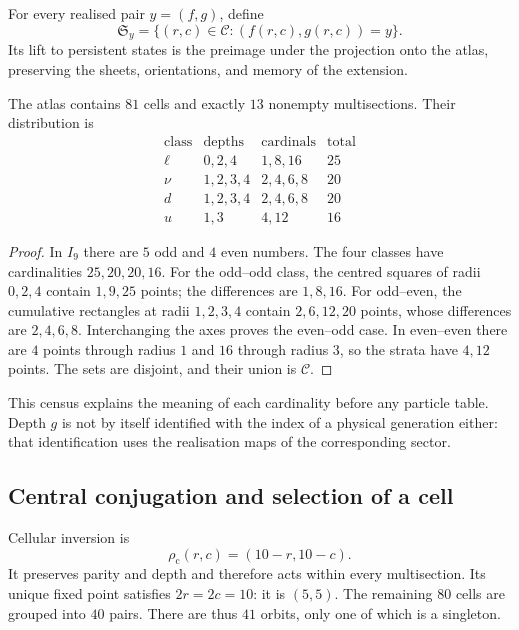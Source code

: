 

\begin{definition}
For every realised pair \(y=(f,g)\), define
\[
 \mathfrak S_y=\{(r,c)\in\mathcal C:(f(r,c),g(r,c))=y\}.
\]
Its lift to persistent states is the preimage under the projection
onto the atlas, preserving the sheets, orientations, and memory of the extension.
\end{definition}

\begin{proposition}
\label{vi:vi:prop:censo13}
The atlas contains \(81\) cells and exactly \(13\) nonempty multisections.
Their distribution is
\[
\begin{array}{c|c|c|r}
\text{class}&\text{depths}&\text{cardinals}&\text{total}\\\hline
\ell&0,2,4&1,8,16&25\\
\nu&1,2,3,4&2,4,6,8&20\\
d&1,2,3,4&2,4,6,8&20\\
u&1,3&4,12&16
\end{array}
\]
\end{proposition}
\begin{proof}
In \(I_9\) there are \(5\) odd and \(4\) even numbers. The four classes have
cardinalities \(25,20,20,16\). For the odd--odd class, the centred squares
of radii \(0,2,4\) contain \(1,9,25\) points; the
differences are \(1,8,16\). For odd--even, the cumulative rectangles
at radii \(1,2,3,4\) contain \(2,6,12,20\) points, whose
differences are \(2,4,6,8\). Interchanging the axes proves the
even--odd case. In even--even there are \(4\) points through radius \(1\) and \(16\)
through radius \(3\), so the strata have \(4,12\) points.
The sets are disjoint, and their union is \(\mathcal C\).
\end{proof}

This census explains the meaning of each cardinality before any particle
table. Depth \(g\) is not by itself identified with the index of a
physical generation either: that identification uses the realisation
maps of the corresponding sector.

\subsection{Central conjugation and selection of a cell}

Cellular inversion is
\[
 \rho_{\mathrm c}(r,c)=(10-r,10-c).
\]
It preserves parity and depth and therefore acts within every
multisection. Its unique fixed point satisfies \(2r=2c=10\): it is \((5,5)\).
The remaining \(80\) cells are grouped into \(40\) pairs. There are thus
\(41\) orbits, only one of which is a singleton.

